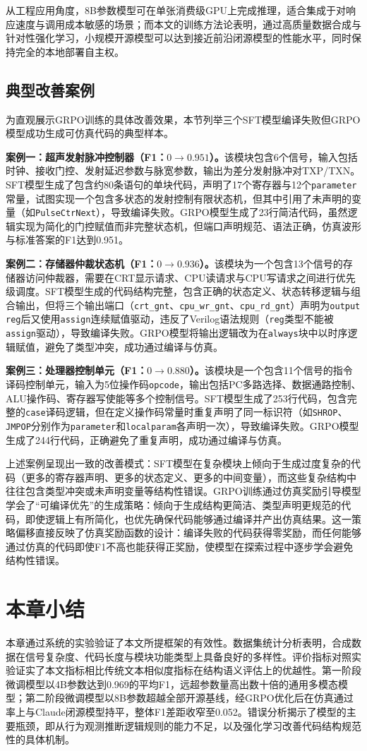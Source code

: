 从工程应用角度，8B参数模型可在单张消费级GPU上完成推理，适合集成于对响应速度与调用成本敏感的场景；而本文的训练方法论表明，通过高质量数据合成与针对性强化学习，小规模开源模型可以达到接近前沿闭源模型的性能水平，同时保持完全的本地部署自主权。

\subsection{典型改善案例}

为直观展示GRPO训练的具体改善效果，本节列举三个SFT模型编译失败但GRPO模型成功生成可仿真代码的典型样本。

\textbf{案例一：超声发射脉冲控制器（F1：$0 \to 0.951$）。}该模块包含6个信号，输入包括时钟、接收门控、发射延迟参数与脉宽参数，输出为差分发射脉冲对TXP/TXN。SFT模型生成了包含约80条语句的单块代码，声明了17个寄存器与12个\texttt{parameter}常量，试图实现一个包含多状态的发射控制有限状态机，但其中引用了未声明的变量（如\texttt{PulseCtrNext}），导致编译失败。GRPO模型生成了23行简洁代码，虽然逻辑实现为简化的门控赋值而非完整状态机，但端口声明规范、语法正确，仿真波形与标准答案的F1达到0.951。

\textbf{案例二：存储器仲裁状态机（F1：$0 \to 0.936$）。}该模块为一个包含13个信号的存储器访问仲裁器，需要在CRT显示请求、CPU读请求与CPU写请求之间进行优先级调度。SFT模型生成的代码结构完整，包含正确的状态定义、状态转移逻辑与组合输出，但将三个输出端口（\texttt{crt\_gnt}、\texttt{cpu\_wr\_gnt}、\texttt{cpu\_rd\_gnt}）声明为\texttt{output reg}后又使用\texttt{assign}连续赋值驱动，违反了Verilog语法规则（\texttt{reg}类型不能被\texttt{assign}驱动），导致编译失败。GRPO模型将输出逻辑改为在\texttt{always}块中以时序逻辑赋值，避免了类型冲突，成功通过编译与仿真。

\textbf{案例三：处理器控制单元（F1：$0 \to 0.880$）。}该模块是一个包含11个信号的指令译码控制单元，输入为5位操作码\texttt{opcode}，输出包括PC多路选择、数据通路控制、ALU操作码、寄存器写使能等多个控制信号。SFT模型生成了253行代码，包含完整的\texttt{case}译码逻辑，但在定义操作码常量时重复声明了同一标识符（如\texttt{SHROP}、\texttt{JMPOP}分别作为\texttt{parameter}和\texttt{localparam}各声明一次），导致编译失败。GRPO模型生成了244行代码，正确避免了重复声明，成功通过编译与仿真。

上述案例呈现出一致的改善模式：SFT模型在复杂模块上倾向于生成过度复杂的代码（更多的寄存器声明、更多的状态定义、更多的中间变量），而这些复杂结构中往往包含类型冲突或未声明变量等结构性错误。GRPO训练通过仿真奖励引导模型学会了“可编译优先”的生成策略：倾向于生成结构更简洁、类型声明更规范的代码，即使逻辑上有所简化，也优先确保代码能够通过编译并产出仿真结果。这一策略偏移直接反映了仿真奖励函数的设计：编译失败的代码获得零奖励，而任何能够通过仿真的代码即使F1不高也能获得正奖励，使模型在探索过程中逐步学会避免结构性错误。


\section{本章小结}

本章通过系统的实验验证了本文所提框架的有效性。数据集统计分析表明，合成数据在信号复杂度、代码长度与模块功能类型上具备良好的多样性。评价指标对照实验证实了本文指标相比传统文本相似度指标在结构语义评估上的优越性。第一阶段微调模型以4B参数达到0.969的平均F1，远超参数量高出数十倍的通用多模态模型；第二阶段微调模型以8B参数超越全部开源基线，经GRPO优化后在仿真通过率上与Claude闭源模型持平，整体F1差距收窄至0.052。错误分析揭示了模型的主要瓶颈，即从行为观测推断逻辑规则的能力不足，以及强化学习改善代码结构规范性的具体机制。


